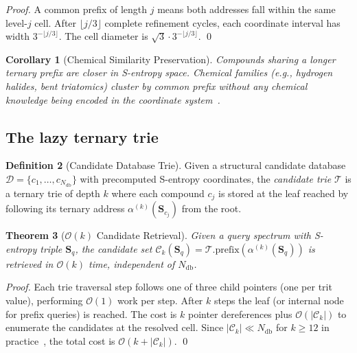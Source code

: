 \documentclass[twocolumn,10pt,a4paper]{article}
\theoremstyle{thmstyle}
\newtheorem{theorem}{Theorem}[section]
\newtheorem{corollary}[theorem]{Corollary}
\theoremstyle{definition}
\newtheorem{definition}[theorem]{Definition}
\theoremstyle{remark}
\newcommand{\Sv}{\mathbf{S}}
\newcommand{\calT}{\mathcal{T}}
\newcommand{\calC}{\mathcal{C}}
\newcommand{\calD}{\mathcal{D}}
\begin{document}
\begin{proof}
A common prefix of length $j$ means both addresses fall within the
same level-$j$ cell. After $\lfloor j/3 \rfloor$ complete refinement
cycles, each coordinate interval has width $3^{-\lfloor j/3 \rfloor}$.
The cell diameter is
$\sqrt{3} \cdot 3^{-\lfloor j/3 \rfloor}$. \qed
\end{proof}

\begin{corollary}[Chemical Similarity Preservation]
Compounds sharing a longer ternary prefix are closer in S-entropy
space. Chemical families (e.g., hydrogen halides, bent triatomics)
cluster by common prefix without any chemical knowledge being
encoded in the coordinate
system~\citep{sachikonye2024generative}.
\end{corollary}

\subsection{The lazy ternary trie}

\begin{definition}[Candidate Database Trie]
\label{def:trie}
Given a structural candidate database
$\calD = \{c_1, \ldots, c_{N_{\mathrm{db}}}\}$ with precomputed
S-entropy coordinates, the \emph{candidate trie} $\calT$ is a ternary
trie of depth $k$ where each compound $c_j$ is stored at the leaf
reached by following its ternary address $\alpha^{(k)}(\Sv_{c_j})$
from the root.
\end{definition}

\begin{theorem}[$\mathcal{O}(k)$ Candidate Retrieval]
\label{thm:retrieval}
Given a query spectrum with S-entropy triple $\Sv_q$, the candidate
set $\calC_k(\Sv_q) = \calT.\mathrm{prefix}(\alpha^{(k)}(\Sv_q))$
is retrieved in $\mathcal{O}(k)$ time, independent of
$N_{\mathrm{db}}$.
\end{theorem}

\begin{proof}
Each trie traversal step follows one of three child pointers (one per
trit value), performing $\mathcal{O}(1)$ work per step. After $k$
steps the leaf (or internal node for prefix queries) is reached. The
cost is $k$ pointer dereferences plus $\mathcal{O}(|\calC_k|)$ to
enumerate the candidates at the resolved cell. Since
$|\calC_k| \ll N_{\mathrm{db}}$ for $k \ge 12$ in
practice~\citep{sachikonye2024generative}, the total cost is
$\mathcal{O}(k + |\calC_k|)$. \qed
\end{proof}
\end{document}
